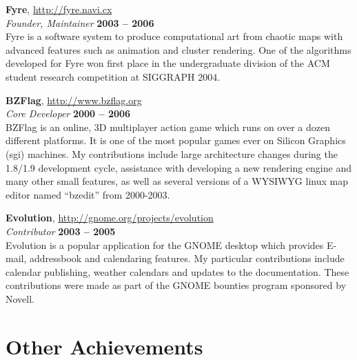 \documentclass[margin,line]{resume}
\begin{document}
\begin{resume}
    {\bf Fyre}, \url{http://fyre.navi.cx} \vspace{2mm}\\\vspace{1mm}%
    {\sl Founder, Maintainer} \hfill {\bf 2003 -- 2006}\\
    Fyre is a software system to produce computational art from chaotic maps
    with advanced features such as animation and cluster rendering.  One of the
    algorithms developed for Fyre won first place in the undergraduate division
    of the ACM student research competition at SIGGRAPH 2004.

    \ifcv
        {\bf BZFlag}, \url{http://www.bzflag.org} \vspace{2mm}\\\vspace{1mm}%
        {\sl Core Developer} \hfill {\bf 2000 -- 2006}\\
        BZFlag is an online, 3D multiplayer action game which runs on over a dozen
        different platforms.  It is one of the most popular games ever on Silicon
        Graphics (sgi) machines. My contributions include large architecture changes
        during the 1.8/1.9 development cycle, assistance with developing a new
        rendering engine and many other small features, as well as several versions
        of a WYSIWYG linux map editor named “bzedit” from 2000-2003.

        {\bf Evolution}, \url{http://gnome.org/projects/evolution} \vspace{2mm}\\\vspace{1mm}%
        {\sl Contributor} \hfill {\bf 2003 -- 2005}\\
        Evolution is a popular application for the GNOME desktop which provides
        E-mail, addressbook and calendaring features.  My particular contributions
        include calendar publishing, weather calendars and updates to the
        documentation.  These contributions were made as part of the GNOME bounties
        program sponsored by Novell.
    \fi


    \section{\mysidestyle Other Achievements}


\end{resume}
\end{document}
